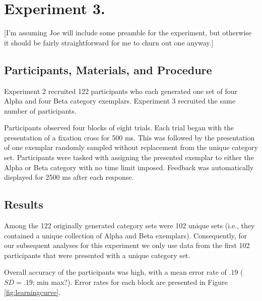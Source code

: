 

% 
\section{Experiment 3.}

[I'm assuming Joe will include some preamble for the experiment, but otherwise
it should be fairly straightforward for me to churn out one anyway.]

\subsection{Participants, Materials, and Procedure}

Experiment 2 recruited 122 participants who each generated one set of four Alpha
and four Beta category exemplars. Experiment 3 recruited the same number of
participants. 

Participants observed four blocks of eight trials. Each trial began with the
presentation of a fixation cross for 500 ms. This was followed by the
presentation of one exemplar randomly sampled without replacement from the
unique category set. Participants were tasked with assigning the presented
exemplar to either the Alpha or Beta category with no time limit imposed.
Feedback was automatically displayed for 2500 ms after each response.

\subsection{Results}

Among the 122 originally generated category sets were 102 unique sets (i.e.,
they contained a unique collection of Alpha and Beta exemplars). Consequently,
for our subsequent analyses for this experiment we only use data from the first
102 participants that were presented with a unique category set.

Overall accuracy of the participants was high, with a mean error rate of $.19$
($SD = .19$; min max?). Error rates for each block are presented in Figure
\ref{fig:learningcurve}.

